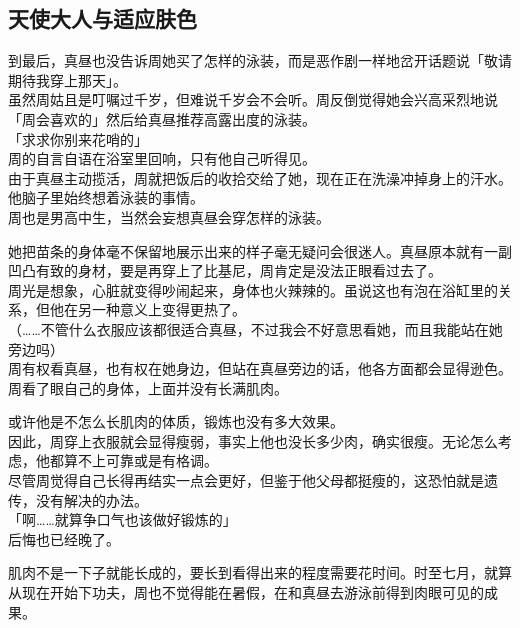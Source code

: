 \subsection{天使大人与适应肤色}

到最后，真昼也没告诉周她买了怎样的泳装，而是恶作剧一样地岔开话题说「敬请期待我穿上那天」。\\

虽然周姑且是叮嘱过千岁，但难说千岁会不会听。周反倒觉得她会兴高采烈地说「周会喜欢的」然后给真昼推荐高露出度的泳装。\\

「求求你别来花哨的」\\

周的自言自语在浴室里回响，只有他自己听得见。\\

由于真昼主动揽活，周就把饭后的收拾交给了她，现在正在洗澡冲掉身上的汗水。他脑子里始终想着泳装的事情。\\

周也是男高中生，当然会妄想真昼会穿怎样的泳装。

她把苗条的身体毫不保留地展示出来的样子毫无疑问会很迷人。真昼原本就有一副凹凸有致的身材，要是再穿上了比基尼，周肯定是没法正眼看过去了。\\

周光是想象，心脏就变得吵闹起来，身体也火辣辣的。虽说这也有泡在浴缸里的关系，但他在另一种意义上变得更热了。\\

（……不管什么衣服应该都很适合真昼，不过我会不好意思看她，而且我能站在她旁边吗）\\

周有权看真昼，也有权在她身边，但站在真昼旁边的话，他各方面都会显得逊色。\\

周看了眼自己的身体，上面并没有长满肌肉。

或许他是不怎么长肌肉的体质，锻炼也没有多大效果。\\

因此，周穿上衣服就会显得瘦弱，事实上他也没长多少肉，确实很瘦。无论怎么考虑，他都算不上可靠或是有格调。\\

尽管周觉得自己长得再结实一点会更好，但鉴于他父母都挺瘦的，这恐怕就是遗传，没有解决的办法。\\

「啊……就算争口气也该做好锻炼的」\\

后悔也已经晚了。

肌肉不是一下子就能长成的，要长到看得出来的程度需要花时间。时至七月，就算从现在开始下功夫，周也不觉得能在暑假，在和真昼去游泳前得到肉眼可见的成果。\\

